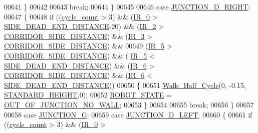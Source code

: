 \begin{DoxyCode}
00641             \}
00642             
00643             \textcolor{keywordflow}{break};
00644         \}
00645         
00646         \textcolor{keywordflow}{case} \hyperlink{state__machine_8h_a94b1da2e055fff4d143aa6aa891f79a9a4c79249036b5395274dd11cabe0636cd}{JUNCTION\_D\_RIGHT}:
00647         \{
00648             \textcolor{keywordflow}{if} ((\hyperlink{state__machine_8c_a937f74a65988b9e22241ab3765b82c50}{cycle\_count} > 3) && (\hyperlink{state__machine_8c_a7afcf874a71b2cde367dc9c28f5f01f1}{IR\_0} > 
      \hyperlink{state__machine_8c_a31ba7e3e0116f665d5825f669052ed09}{SIDE\_DEAD\_END\_DISTANCE}-20) && (\hyperlink{state__machine_8c_a07cfb2e201909d017a88a2a86c32cd4b}{IR\_2} > 
      \hyperlink{state__machine_8c_a201d56046ddf552d57b4862e0ec07a10}{CORRIDOR\_SIDE\_DISTANCE}) && (\hyperlink{state__machine_8c_a7831b71dc250258ecefe0e23f9920688}{IR\_3} > 
      \hyperlink{state__machine_8c_a201d56046ddf552d57b4862e0ec07a10}{CORRIDOR\_SIDE\_DISTANCE}) && 
00649                 (\hyperlink{state__machine_8c_ad00ba6cc1cf461bda7059f5aafc06142}{IR\_5} > \hyperlink{state__machine_8c_a201d56046ddf552d57b4862e0ec07a10}{CORRIDOR\_SIDE\_DISTANCE}) && (
      \hyperlink{state__machine_8c_ad00ba6cc1cf461bda7059f5aafc06142}{IR\_5} < \hyperlink{state__machine_8c_a31ba7e3e0116f665d5825f669052ed09}{SIDE\_DEAD\_END\_DISTANCE}) && (\hyperlink{state__machine_8c_a8c51bcd8b555e8c78fea79b88d28b55e}{IR\_6} > 
      \hyperlink{state__machine_8c_a201d56046ddf552d57b4862e0ec07a10}{CORRIDOR\_SIDE\_DISTANCE}) && (\hyperlink{state__machine_8c_a8c51bcd8b555e8c78fea79b88d28b55e}{IR\_6} < 
      \hyperlink{state__machine_8c_a31ba7e3e0116f665d5825f669052ed09}{SIDE\_DEAD\_END\_DISTANCE}))
00650             \{
00651                 \hyperlink{gangstilar_8c_a8b22e9229a15d20adb676428ad7f6dac}{Walk\_Half\_Cycle}(0, -0.15, \hyperlink{state__machine_8c_ac66326c4fb942a9dfa998832832bc776}{STANDARD\_HEIGHT},0);
00652                 \hyperlink{state__machine_8h_a5e5321a4a9085b83c8161454bf7a145c}{ROBOT\_STATE} = \hyperlink{state__machine_8h_a94b1da2e055fff4d143aa6aa891f79a9a72c6eea91f84cfab54daac571b35fc53}{OUT\_OF\_JUNCTION\_NO\_WALL};
00653             \}
00654             
00655             \textcolor{keywordflow}{break};
00656         \}
00657         
00658         \textcolor{keywordflow}{case} \hyperlink{state__machine_8h_a94b1da2e055fff4d143aa6aa891f79a9afd4bf9b1cf12bf83f91c864017a34d86}{JUNCTION\_G}:
00659         \textcolor{keywordflow}{case} \hyperlink{state__machine_8h_a94b1da2e055fff4d143aa6aa891f79a9aaf21fb2e0dadd1529453341900854a75}{JUNCTION\_D\_LEFT}:
00660         \{
00661             \textcolor{keywordflow}{if} ((\hyperlink{state__machine_8c_a937f74a65988b9e22241ab3765b82c50}{cycle\_count} > 3) && (\hyperlink{state__machine_8c_a7afcf874a71b2cde367dc9c28f5f01f1}{IR\_0} > 

\end{DoxyCode}
